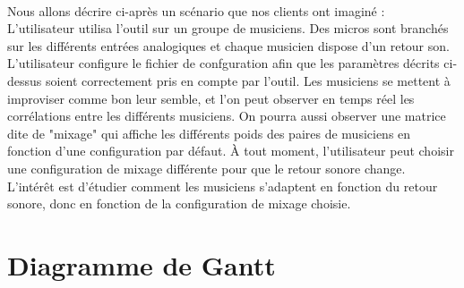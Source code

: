 \documentclass{article}
\begin{document}
      \paragraph{}
      Nous allons décrire ci-après un scénario que nos clients ont imaginé :\\
      L'utilisateur utilisa l'outil sur un groupe de musiciens. Des micros sont
      branchés sur les différents entrées analogiques et chaque musicien dispose
      d'un retour son. L'utilisateur configure le fichier de confguration afin
      que les paramètres décrits ci-dessus soient correctement pris en compte
      par l'outil. Les musiciens se mettent à improviser comme bon leur semble,
      et l'on peut observer en temps réel les corrélations entre les différents
      musiciens. On pourra aussi observer une matrice dite de "mixage" qui
      affiche les différents poids des paires de musiciens en fonction d'une
      configuration par défaut. À tout moment, l'utilisateur peut choisir une
      configuration de mixage différente pour que le retour sonore change.\\
      L'intérêt est d'étudier comment les musiciens s'adaptent en fonction du
      retour sonore, donc en fonction de la configuration de mixage choisie.
  \section{Diagramme de Gantt}
  
\end{document}
